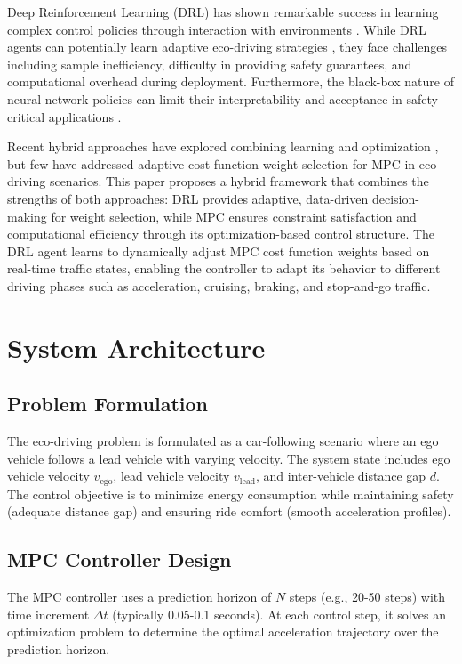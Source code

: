 \documentclass[conference,onecolumn,draftclsnofoot]{IEEEtran}
\begin{document}
Deep Reinforcement Learning (DRL) has shown remarkable success in learning complex control policies through interaction with environments \cite{b3, b13}. While DRL agents can potentially learn adaptive eco-driving strategies \cite{b14}, they face challenges including sample inefficiency, difficulty in providing safety guarantees, and computational overhead during deployment. Furthermore, the black-box nature of neural network policies can limit their interpretability and acceptance in safety-critical applications \cite{b7}.

Recent hybrid approaches have explored combining learning and optimization \cite{b15, b16}, but few have addressed adaptive cost function weight selection for MPC in eco-driving scenarios. This paper proposes a hybrid framework that combines the strengths of both approaches: DRL provides adaptive, data-driven decision-making for weight selection, while MPC ensures constraint satisfaction and computational efficiency through its optimization-based control structure. The DRL agent learns to dynamically adjust MPC cost function weights based on real-time traffic states, enabling the controller to adapt its behavior to different driving phases such as acceleration, cruising, braking, and stop-and-go traffic.

\section{System Architecture}

\subsection{Problem Formulation}

The eco-driving problem is formulated as a car-following scenario where an ego vehicle follows a lead vehicle with varying velocity. The system state includes ego vehicle velocity $v_{\text{ego}}$, lead vehicle velocity $v_{\text{lead}}$, and inter-vehicle distance gap $d$. The control objective is to minimize energy consumption while maintaining safety (adequate distance gap) and ensuring ride comfort (smooth acceleration profiles).

\subsection{MPC Controller Design}

The MPC controller uses a prediction horizon of $N$ steps (e.g., 20-50 steps) with time increment $\Delta t$ (typically 0.05-0.1 seconds). At each control step, it solves an optimization problem to determine the optimal acceleration trajectory over the prediction horizon.
\end{document}
